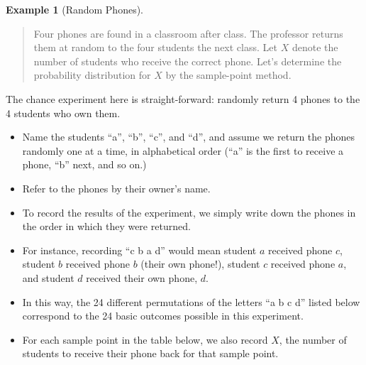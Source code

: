 \documentclass[
]{book}
\providecommand{\tightlist}{%
  \setlength{\itemsep}{0pt}\setlength{\parskip}{0pt}}
\theoremstyle{definition}
\theoremstyle{definition}
\newtheorem{example}{Example}[chapter]
\theoremstyle{definition}
\theoremstyle{definition}
\theoremstyle{remark}
\begin{document}
\begin{example}[Random Phones]
\protect\hypertarget{exm:random-phones}{}\label{exm:random-phones}\leavevmode

\begin{quote}
Four phones are found in a classroom after class. The professor returns them at random to the four students the next class. Let \(X\) denote the number of students who receive the correct phone. Let's determine the probability distribution for \(X\) by the sample-point method.
\end{quote}

The chance experiment here is straight-forward: randomly return 4 phones to the 4 students who own them.

\begin{itemize}
\tightlist
\item
  Name the students ``a'', ``b'', ``c'', and ``d'', and assume we return the phones randomly one at a time, in alphabetical order (``a'' is the first to receive a phone, ``b'' next, and so on.)\\
\item
  Refer to the phones by their owner's name.
\item
  To record the results of the experiment, we simply write down the phones in the order in which they were returned.\\
\item
  For instance, recording ``c b a d'' would mean student \(a\) received phone \(c\), student \(b\) received phone \(b\) (their own phone!), student \(c\) received phone \(a\), and student \(d\) received their own phone, \(d\).
\item
  In this way, the 24 different permutations of the letters ``a b c d'' listed below correspond to the 24 basic outcomes possible in this experiment.
\item
  For each sample point in the table below, we also record \(X\), the number of students to receive their phone back for that sample point.
\end{itemize}


\end{example}
\end{document}
